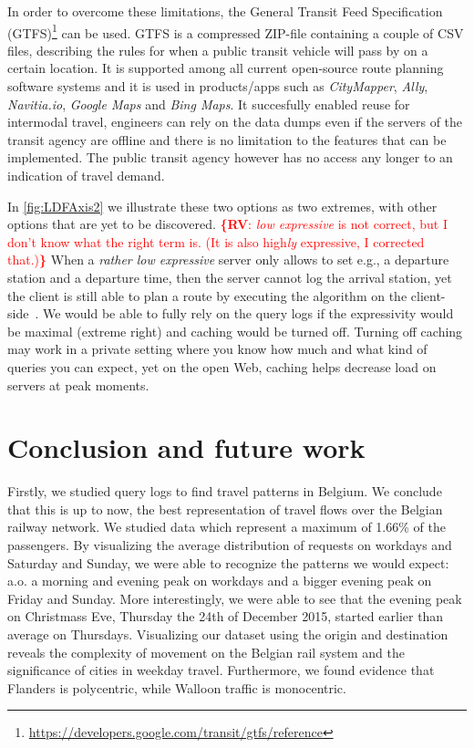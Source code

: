 \documentclass{sig-alternate}
\newcommand{\rv}[1]{\noindent\textcolor{red}{{\bf \{RV}: #1{\bf \}}}}
\begin{document}
In order to overcome these limitations, the General Transit Feed Specification (GTFS)\footnote{\url{https://developers.google.com/transit/gtfs/reference}} can be used. 
GTFS is a compressed ZIP-file containing a couple of CSV files, describing the rules for when a public transit vehicle will pass by on a certain location.
It is supported among all current open-source route planning software systems and it is used in products/apps such as \emph{CityMapper}, \emph{Ally}, \emph{Navitia.io}, \emph{Google Maps} and \emph{Bing Maps}.
It succesfully enabled reuse for intermodal travel, engineers can rely on the data dumps even if the servers of the transit agency are offline and there is no limitation to the features that can be implemented.
The public transit agency however has no access any longer to an indication of travel demand.

In \cref{fig:LDFAxis2} we illustrate these two options as two extremes, with other options that are yet to be discovered.
\rv{\emph{low expressive} is not correct, but I don't know what the right term is. (It is also high\emph{ly} expressive, I corrected that.)}
When a \emph{rather low expressive} server only allows to set e.g., a departure station and a departure time, then the server cannot log the arrival station, yet the client is still able to plan a route by executing the algorithm on the client-side~\cite{lc}.
We would be able to fully rely on the query logs if the expressivity would be maximal (extreme right) and caching would be turned off. 
Turning off caching may work in a private setting where you know how much and what kind of queries you can expect, yet on the open Web, caching helps decrease load on servers at peak moments.

\section{Conclusion and future work}
\label{sec:conclusion}

Firstly, we studied query logs to find travel patterns in Belgium.
We conclude that this is up to now, the best representation of travel flows over the Belgian railway network.%
We studied data which represent a maximum of 1.66\% of the passengers.
By visualizing the average distribution of requests on workdays and Saturday and Sunday, we were able to recognize the patterns we would expect: a.o. a morning and evening peak on workdays and a bigger evening peak on Friday and Sunday.
More interestingly, we were able to see that the evening peak on Christmass Eve, Thursday the 24th of December 2015, started earlier than average on Thursdays.
Visualizing our dataset using the origin and destination reveals the complexity of movement on the Belgian rail system and the significance of cities in weekday travel.
Furthermore, we found evidence that Flanders is polycentric, while Walloon traffic is monocentric.
\end{document}
